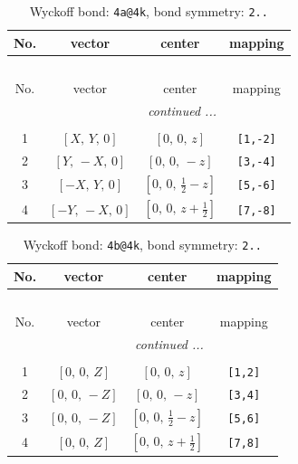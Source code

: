 \documentclass[fleqn,8pt]{jsarticle}
\begin{document}
\begin{longtable}{cccc}
\caption{Wyckoff bond: {\tt 4a@4k}, bond symmetry: {\tt 2..}}
 \\
 \hline \hline
No. & vector & center & mapping \\ \hline \endfirsthead

\multicolumn{3}{l}{\tablename\ \thetable{}} \\
 \hline \hline
No. & vector & center & mapping \\ \hline \endhead

 \hline \hline
\multicolumn{3}{r}{\footnotesize\it continued ...} \\ \endfoot

 \hline \hline
\multicolumn{3}{r}{} \\ \endlastfoot

1 & $\left[ X,\, Y,\, 0 \right]$ & $\left[ 0,\, 0,\, z \right]$ & {\tt [1,-2]} \\ \hline
2 & $\left[ Y,\, - X,\, 0 \right]$ & $\left[ 0,\, 0,\, - z \right]$ & {\tt [3,-4]} \\ \hline
3 & $\left[ - X,\, Y,\, 0 \right]$ & $\left[ 0,\, 0,\, \frac{1}{2} - z \right]$ & {\tt [5,-6]} \\ \hline
4 & $\left[ - Y,\, - X,\, 0 \right]$ & $\left[ 0,\, 0,\, z + \frac{1}{2} \right]$ & {\tt [7,-8]} \\
\end{longtable}
\renewcommand{\arraystretch}{1.2}
\begin{longtable}{cccc}
\caption{Wyckoff bond: {\tt 4b@4k}, bond symmetry: {\tt 2..}}
 \\
 \hline \hline
No. & vector & center & mapping \\ \hline \endfirsthead

\multicolumn{3}{l}{\tablename\ \thetable{}} \\
 \hline \hline
No. & vector & center & mapping \\ \hline \endhead

 \hline \hline
\multicolumn{3}{r}{\footnotesize\it continued ...} \\ \endfoot

 \hline \hline
\multicolumn{3}{r}{} \\ \endlastfoot

1 & $\left[ 0,\, 0,\, Z \right]$ & $\left[ 0,\, 0,\, z \right]$ & {\tt [1,2]} \\ \hline
2 & $\left[ 0,\, 0,\, - Z \right]$ & $\left[ 0,\, 0,\, - z \right]$ & {\tt [3,4]} \\ \hline
3 & $\left[ 0,\, 0,\, - Z \right]$ & $\left[ 0,\, 0,\, \frac{1}{2} - z \right]$ & {\tt [5,6]} \\ \hline
4 & $\left[ 0,\, 0,\, Z \right]$ & $\left[ 0,\, 0,\, z + \frac{1}{2} \right]$ & {\tt [7,8]} \\
\end{longtable}
\end{document}
